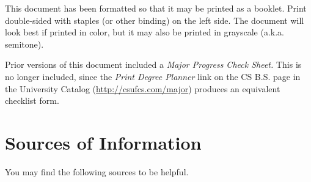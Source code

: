 \documentclass{book}
\newcommand{\shrunkurl}[1]{\url{http://csufcs.com/#1}}
\begin{document}
This document has been formatted so that it may be printed as a
booklet. Print double-sided with staples (or other binding) on the
left side. The document will look best if printed in color, but it may
also be printed in grayscale (a.k.a. semitone).

Prior versions of this document included a \emph{Major Progress Check
  Sheet.} This is no longer included, since the \emph{Print Degree
  Planner} link on the CS B.S. page in the University Catalog
(\shrunkurl{major}) produces an equivalent checklist form.

\chapter{Sources of Information}

You may find the following sources to be helpful.
\end{document}
